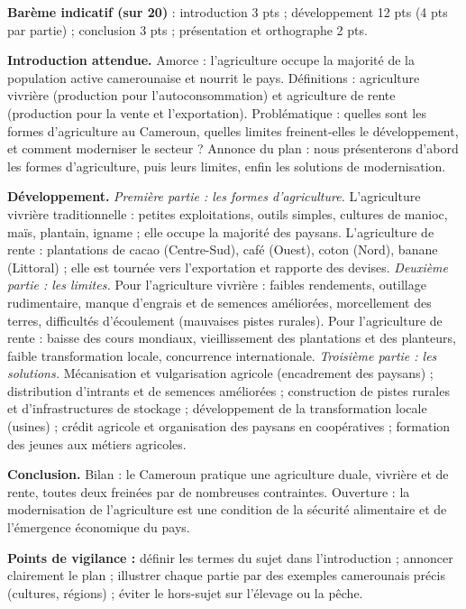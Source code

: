 \documentclass[11pt]{article}
\begin{document}
\begin{corrige}
\textbf{Barème indicatif (sur 20)} : introduction 3 pts ; développement 12 pts (4 pts par partie) ; conclusion 3 pts ; présentation et orthographe 2 pts.

\textbf{Introduction attendue.} Amorce : l'agriculture occupe la majorité de la population active camerounaise et nourrit le pays. Définitions : agriculture vivrière (production pour l'autoconsommation) et agriculture de rente (production pour la vente et l'exportation). Problématique : quelles sont les formes d'agriculture au Cameroun, quelles limites freinent-elles le développement, et comment moderniser le secteur ? Annonce du plan : nous présenterons d'abord les formes d'agriculture, puis leurs limites, enfin les solutions de modernisation.

\textbf{Développement.}
\emph{Première partie : les formes d'agriculture.} L'agriculture vivrière traditionnelle : petites exploitations, outils simples, cultures de manioc, maïs, plantain, igname ; elle occupe la majorité des paysans. L'agriculture de rente : plantations de cacao (Centre-Sud), café (Ouest), coton (Nord), banane (Littoral) ; elle est tournée vers l'exportation et rapporte des devises.
\emph{Deuxième partie : les limites.} Pour l'agriculture vivrière : faibles rendements, outillage rudimentaire, manque d'engrais et de semences améliorées, morcellement des terres, difficultés d'écoulement (mauvaises pistes rurales). Pour l'agriculture de rente : baisse des cours mondiaux, vieillissement des plantations et des planteurs, faible transformation locale, concurrence internationale.
\emph{Troisième partie : les solutions.} Mécanisation et vulgarisation agricole (encadrement des paysans) ; distribution d'intrants et de semences améliorées ; construction de pistes rurales et d'infrastructures de stockage ; développement de la transformation locale (usines) ; crédit agricole et organisation des paysans en coopératives ; formation des jeunes aux métiers agricoles.

\textbf{Conclusion.} Bilan : le Cameroun pratique une agriculture duale, vivrière et de rente, toutes deux freinées par de nombreuses contraintes. Ouverture : la modernisation de l'agriculture est une condition de la sécurité alimentaire et de l'émergence économique du pays.

\textbf{Points de vigilance :} définir les termes du sujet dans l'introduction ; annoncer clairement le plan ; illustrer chaque partie par des exemples camerounais précis (cultures, régions) ; éviter le hors-sujet sur l'élevage ou la pêche.
\end{corrige}
\end{document}
